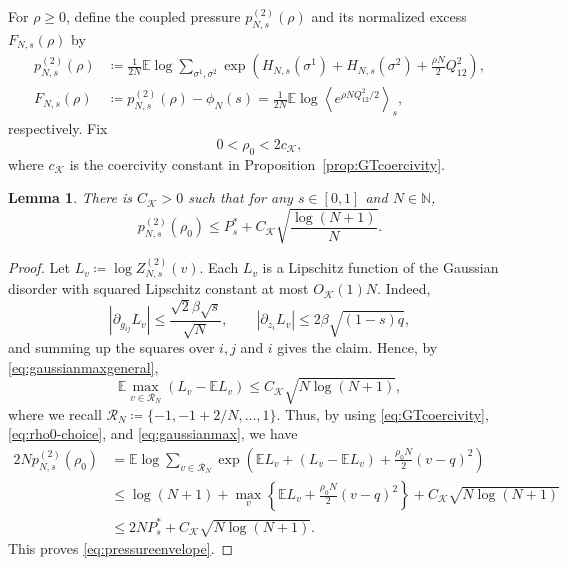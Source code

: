 \documentclass[11pt]{article}
\newtheorem{lemma}[theorem]{Lemma}
\numberwithin{equation}{section}
\newcommand{\E}{\mathbb{E}}
\newcommand{\1}{\mathbf 1}
\newcommand{\cK}{\mathcal K}
\newcommand{\braket}[1]{\left\langle #1\right\rangle}
\begin{document}
For $\rho\ge0$, define the coupled pressure $p^{(2)}_{N,s}(\rho)$ and its normalized excess $F_{N,s}(\rho)$ by
\begin{align}
 p^{(2)}_{N,s}(\rho)
 &\coloneqq
 \frac1{2N}\E\log
 \sum_{\sigma^1,\sigma^2}
 \exp\left(
 H_{N,s}(\sigma^1)+H_{N,s}(\sigma^2)
 +\frac{\rho N}{2}Q_{12}^2\right),
 \label{eq:quadraticpressure}\\
 F_{N,s}(\rho)
 &\coloneqq
 p^{(2)}_{N,s}(\rho)-\phi_N(s)
 =
 \frac1{2N}\E\log
 \braket{e^{\rho NQ_{12}^2/2}}_s ,
 \label{eq:normalizedcoupling}
\end{align}
respectively.
Fix
\begin{equation}
 0<\rho_0<2c_{\cK},
 \label{eq:rho0-choice}
\end{equation}
where $c_{\cK}$ is the coercivity constant in
Proposition~\ref{prop:GTcoercivity}.

\begin{lemma}
\label{lem:sublinearpressure}
There is $C_\cK>0$ such that for any $s\in [0,1]$ and $N\in \mathbb N$, 
\begin{equation}
 p^{(2)}_{N,s}(\rho_0)\le P_s^*+C_{\cK} 
 \sqrt{\frac{\log(N+1)}N}.
 \label{eq:pressureenvelope}
\end{equation}

\end{lemma}

\begin{proof}
Let $L_v\coloneqq\log Z^{(2)}_{N,s}(v)$.  Each $L_v$ is a Lipschitz function
of the Gaussian disorder with squared Lipschitz constant at most
$O_{\cK}(1)N$.  Indeed,
\[
 \left|\partial_{g_{ij}}L_v\right|
 \le\frac{\sqrt2\beta\sqrt s}{\sqrt N},\qquad
 \left|\partial_{z_i}L_v\right|
 \le2\beta\sqrt{(1-s)q},
\]
and summing up the squares over $i,j$ and $i$ gives the claim.  Hence, by \eqref{eq:gaussianmaxgeneral}, 
\begin{equation}
 \mathbb{E}\max_{v\in\mathcal R_N}(L_v-\E L_v)
 \le C_{\cK} \sqrt{N\log(N+1)},
 \label{eq:gaussianmax}
\end{equation}
where we recall $\mathcal R_N \coloneqq \{ -1,-1+2/N,\ldots,1\}$.
Thus, by using \eqref{eq:GTcoercivity}, \eqref{eq:rho0-choice}, and \eqref{eq:gaussianmax}, we have
\begin{align*}
 2Np^{(2)}_{N,s}(\rho_0)
 &=
 \E\log\sum_{v\in\mathcal R_N}
 \exp\left(\E L_v + (L_v - \E L_v ) +\frac{\rho_0N}{2}(v-q)^2\right)\\
 &\le
 \log(N+1)+
 \max_v\left\{\E L_v+\frac{\rho_0N}{2}(v-q)^2\right\}
 +C_{\cK}\sqrt{N\log(N+1)}\\
 &\le2NP_s^*+C_{\cK} 
 \sqrt{{N\log(N+1)}}.
\end{align*}
This proves \eqref{eq:pressureenvelope}.
\end{proof}
\end{document}
